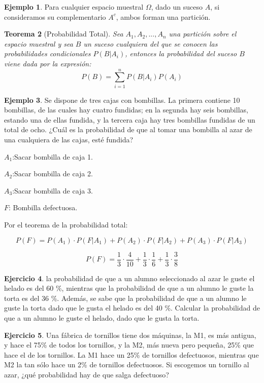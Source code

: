 \documentclass[]{book}
\theoremstyle{plain}
\newtheorem{theorem}{Teorema}[section]
\theoremstyle{definition}
\newtheorem{example}[theorem]{Ejemplo}
\newtheorem{exercise}[theorem]{Ejercicio}
\theoremstyle{definition} %
\begin{document}
\begin{example}
  Para cualquier espacio muestral \(\Omega\), dado un suceso \(A\), si
consideramos su complementario \(A^c\), ambos forman una partición.

\end{example}

 
\begin{theorem}[Probabilidad Total]
  Sea \(A_{1},A_{2},...,A_{n}\) una partición sobre el espacio muestral y
sea \(B\) un suceso cualquiera del que se conocen las probabilidades
condicionales \(P(B|A_i)\), entonces la probabilidad del suceso \(B\)
viene dada por la expresión:
\[{\displaystyle P(B)=\sum _{i=1}^{n}P(B|A_{i})P(A_{i})} \]
 
\end{theorem}


\begin{example}
  Se dispone de tres cajas con bombillas. La primera contiene 10
bombillas, de las cuales hay cuatro fundidas; en la segunda hay seis
bombillas, estando una de ellas fundida, y la tercera caja hay tres
bombillas fundidas de un total de ocho. ¿Cuál es la probabilidad de que
al tomar una bombilla al azar de una cualquiera de las cajas, esté
fundida?

\(A_1\):Sacar bombilla de caja 1.

\(A_2\):Sacar bombilla de caja 2.

\(A_3\):Sacar bombilla de caja 3.

\(F\): Bombilla defectuosa.

Por el teorema de la probabilidad total:

\[{P(F)=P(A_1)\cdot P(F|A_1) + P(A_2)\cdot P(F|A_2)+ P(A_3)\cdot P(F|A_3)}\]

\[P(F)=\frac{1}{3}\cdot \frac{4}{10} + \frac{1}{3}\cdot \frac{1}{6} + \frac{1}{3}\cdot \frac{3}{8}\]

\end{example}

\begin{exercise}

  la probabilidad de que a un alumno seleccionado al azar le guste el
  helado es del 60 \%, mientras que la probabilidad de que a un alumno
  le guste la torta es del 36 \%. Además, se sabe que la probabilidad de
  que a un alumno le guste la torta dado que le gusta el helado es del
  40 \%. Calcular la probabilidad de que a un alumno le guste el helado,
  dado que le gusta la torta.
\end{exercise}
  \begin{exercise}

  Una fábrica de tornillos tiene dos máquinas, la M1, es más antigua, y
  hace el 75\% de todos los tornillos, y la M2, más nueva pero pequeña,
  25\% que hace el de los tornillos. La M1 hace un 25\% de tornillos
  defectuosos, mientras que M2 la tan sólo hace un 2\% de tornillos
  defectuosos. Si escogemos un tornillo al azar, ¿qué probabilidad hay
  de que salga defectuoso?
\end{exercise}
\end{document}
